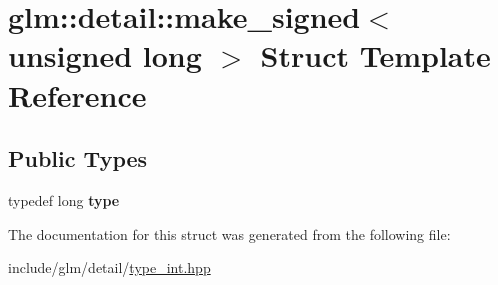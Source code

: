 \hypertarget{structglm_1_1detail_1_1make__signed_3_01unsigned_01long_01_4}{}\section{glm\+:\+:detail\+:\+:make\+\_\+signed$<$ unsigned long $>$ Struct Template Reference}
\label{structglm_1_1detail_1_1make__signed_3_01unsigned_01long_01_4}
\subsection*{Public Types}
\begin{DoxyCompactItemize}
\item 
\mbox{\label{structglm_1_1detail_1_1make__signed_3_01unsigned_01long_01_4_a055abdf7ba75d133a9784c2749f2336f}} 
typedef long {\bfseries type}
\end{DoxyCompactItemize}


The documentation for this struct was generated from the following file\+:\begin{DoxyCompactItemize}
\item 
include/glm/detail/\hyperlink{type__int_8hpp}{type\+\_\+int.\+hpp}\end{DoxyCompactItemize}
